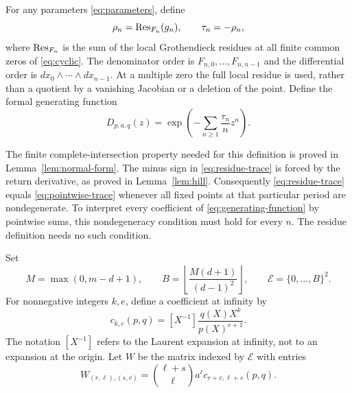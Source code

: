 \begin{definition}\label{def:residue-trace}
For any parameters \eqref{eq:parameters}, define
\begin{equation}\label{eq:residue-trace}
 \rho_n=\operatorname{Res}_{F_n}(g_n),\qquad \tau_n=-\rho_n,
\end{equation}
where $\operatorname{Res}_{F_n}$ is the sum of the local Grothendieck residues at all
finite common zeros of \eqref{eq:cyclic}. The denominator order is
$F_{n,0},\ldots,F_{n,n-1}$ and the differential order is
$dx_0\wedge\cdots\wedge dx_{n-1}$. At a multiple zero the full local
residue is used, rather than a quotient by a vanishing Jacobian or a
deletion of the point. Define the formal generating function
\begin{equation}\label{eq:generating-function}
 D_{p,a,q}(z)=\exp\left(-\sum_{n\ge1}\frac{\tau_n}{n}z^n\right).
\end{equation}
\end{definition}

The finite complete-intersection property needed for this definition is
proved in Lemma~\ref{lem:normal-form}. The minus sign in
\eqref{eq:residue-trace} is forced by the return derivative, as proved in
Lemma~\ref{lem:hill}. Consequently \eqref{eq:residue-trace} equals
\eqref{eq:pointwise-trace} whenever all fixed points at that particular
period are nondegenerate. To interpret every coefficient of
\eqref{eq:generating-function} by pointwise sums, this nondegeneracy
condition must hold for every $n$. The residue definition needs no such
condition.

Set
\begin{equation}\label{eq:state-bound}
 M=\max(0,m-d+1),\qquad
 B=\left\lfloor\frac{M(d+1)}{(d-1)^2}\right\rfloor,
 \qquad \mathcal E=\{0,\ldots,B\}^2.
\end{equation}
For nonnegative integers $k,e$, define a coefficient at infinity by
\begin{equation}\label{eq:local-coefficient}
 c_{k,e}(p,q)=[X^{-1}]\frac{q(X)X^k}{p(X)^{e+1}}.
\end{equation}
The notation $[X^{-1}]$ refers to the Laurent expansion at infinity,
not to an expansion at the origin. Let $W$ be the matrix indexed by
$\mathcal E$ with entries
\begin{equation}\label{eq:edge-matrix}
 W_{(r,\ell),(s,v)}=
 \binom{\ell+s}{\ell}a^\ell c_{r+v,\ell+s}(p,q).
\end{equation}

